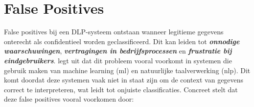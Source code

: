 

\section{False Positives}
\label{sec:false-positives-literatuurstudie}

False positives bij een DLP-systeem ontstaan wanneer legitieme gegevens onterecht als confidentieel worden geclassificeerd.
Dit kan leiden tot  \textit{\textbf{onnodige waarschuwingen}}, \textit{\textbf{vertragingen in bedrijfsprocessen}} en \textit{\textbf{frustratie bij eindgebruikers}}. 
\textcite{Lukas2023} legt uit dat dit probleem vooral voorkomt in systemen die gebruik maken van machine learning (\gls{ml}) en natuurlijke taalverwerking (\gls{nlp}). 
Dit komt doordat deze systemen vaak niet in staat zijn om de context van gegevens correct te interpreteren, wat leidt tot onjuiste classificaties.
Concreet stelt \textcite{Lukas2023} dat deze false positives vooral voorkomen door:

